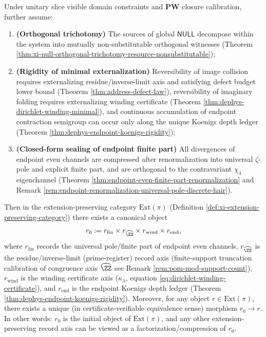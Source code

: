 \begin{theorem}\label{thm:xi-extension-preserving-initial-object}
Under unitary slice visible domain constraints and \(\mathbf{PW}\) closure calibration, further assume:
\begin{enumerate}
  \item \textbf{(Orthogonal trichotomy)} The sources of global \(\mathsf{NULL}\) decompose within the system into mutually non-substitutable orthogonal witnesses (Theorem \ref{thm:xi-null-orthogonal-trichotomy-resource-nonsubstitutable});
  \item \textbf{(Rigidity of minimal externalization)} Reversibility of image collision requires externalizing residue/inverse-limit axis and satisfying defect budget lower bound (Theorem \ref{thm:address-defect-law}), reversibility of imaginary folding requires externalizing winding certificate (Theorem \ref{thm:dephys-dirichlet-winding-minimal}), and continuous accumulation of endpoint contraction semigroup can occur only along the unique Koenigs depth ledger (Theorem \ref{thm:dephys-endpoint-koenigs-rigidity});
  \item \textbf{(Closed-form sealing of endpoint finite part)} All divergences of endpoint even channels are compressed after renormalization into universal \(\zeta\)-pole and explicit finite part, and are orthogonal to the contravariant \(\chi_4\) eigenchannel (Theorem \ref{thm:endpoint-even-finite-part-renormalization} and Remark \ref{rem:endpoint-renormalization-universal-pole-discrete-hair}).
\end{enumerate}
Then in the extension-preserving category \(\mathrm{Ext}(\pi)\) (Definition \ref{def:xi-extension-preserving-category}) there exists a canonical object
\[
r_0
:=
r_{\mathrm{fin}}\times r_{\widehat{\ZZ}}\times r_{\mathrm{wind}}\times r_{\mathrm{end}},
\]
where \(r_{\mathrm{fin}}\) records the universal pole/finite part of endpoint even channels, \(r_{\widehat{\ZZ}}\) is the residue/inverse-limit (prime-register) record axis (finite-support truncation calibration of congruence axis \(\widehat{\ZZ}\) see Remark \ref{rem:pom-mod-support-count}), \(r_{\mathrm{wind}}\) is the winding certificate axis (\(\kappa_\lambda\), equation \eqref{eq:dirichlet-winding-certificate}), and \(r_{\mathrm{end}}\) is the endpoint Koenigs depth ledger (Theorem \ref{thm:dephys-endpoint-koenigs-rigidity}).
Moreover, for any object \(r\in\mathrm{Ext}(\pi)\), there exists a unique (in certificate-verifiable equivalence sense) morphism \(r_0\to r\).
In other words: \(r_0\) is the initial object of \(\mathrm{Ext}(\pi)\), and any other extension-preserving record axis can be viewed as a factorization/compression of \(r_0\).
\end{theorem}

